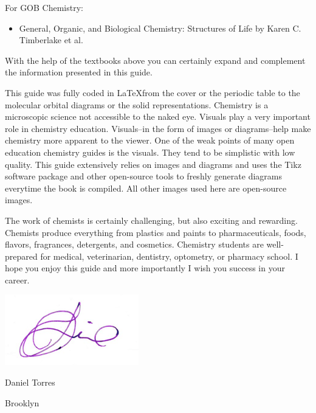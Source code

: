 \documentclass[main.tex]{subfiles}
\begin{document}
\begin{fullwidth}
\begin{multicols*}{2}
For GOB Chemistry:
\begin{small}\begin{itemize}[label=]
\setlength\itemsep{0.5em}\item General, Organic, and Biological Chemistry: Structures of Life by Karen C. Timberlake et al.
\end{itemize}\end{small}



With the help of the textbooks above you can certainly expand and complement the information presented in this guide.

This guide was fully coded in \LaTeX from the cover or the periodic table to the molecular orbital diagrams or the solid representations. Chemistry is a microscopic science not accessible to the naked eye. Visuals play a very important role in chemistry education. Visuals--in the form of images or diagrams--help make chemistry more apparent to the viewer. One of the weak points of many open education chemistry guides is the visuals. They tend to be simplistic with low quality. This guide extensively relies on images and diagrams and uses the Tikz software package and other open-source tools to freshly generate diagrams everytime the book is compiled. All other images used here are open-source images.

The work of chemists is certainly challenging, but also exciting and rewarding. Chemists produce everything from plastics and paints to pharmaceuticals, foods, flavors, fragrances, detergents, and cosmetics. Chemistry students are well-prepared for medical, veterinarian, dentistry, optometry, or pharmacy school. I hope you enjoy this guide and more importantly I wish you success in your career.  
\par \medskip
\includegraphics[height=4.5\baselineskip,]{./tothereader/signature} \par
Daniel Torres \par
Brooklyn
\end{multicols*}
\end{fullwidth}
\restoregeometry
{}
\end{document}

